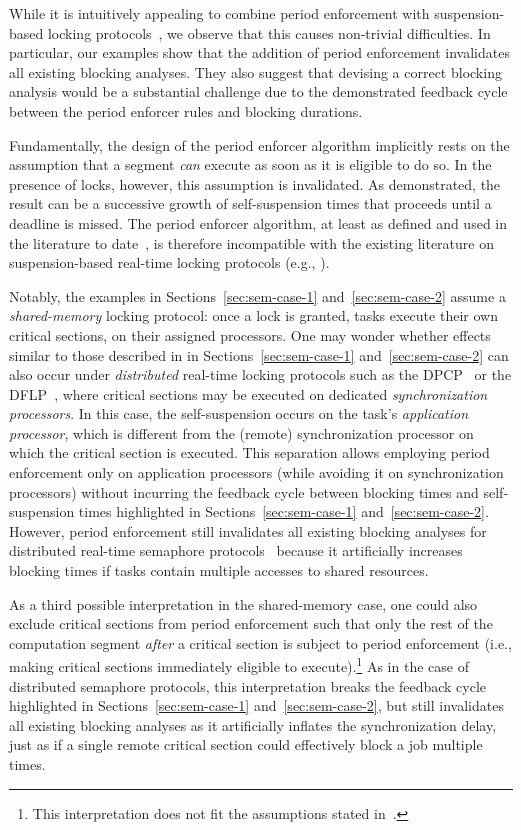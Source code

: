 While it is intuitively appealing to combine period enforcement with suspension-based locking protocols~\cite{Raj:91,Lak:11,LNR:09}, we observe that this causes non-trivial difficulties. In particular, our examples show that the addition of period enforcement invalidates all existing blocking analyses. They also suggest that devising a correct blocking analysis would be a substantial challenge due to the demonstrated feedback cycle between the period enforcer rules and blocking durations. 


Fundamentally, the design of the period enforcer algorithm implicitly rests on the assumption that a segment \emph{can} execute as soon as it is eligible to do so. In the presence of locks, however, this assumption is invalidated. As demonstrated, the result can be a successive growth of self-suspension times that proceeds until a deadline is missed.  The period enforcer algorithm, at least as defined and used in the literature to date~\cite{Raj:suspension1991,Raj:91}, is therefore incompatible with the existing literature on suspension-based real-time locking protocols (e.g., \cite{Raj:91,Lak:11,LNR:09,BLBA:07,Br:13}). 

Notably, the examples in Sections~\ref{sec:sem-case-1} and~\ref{sec:sem-case-2} assume a \emph{shared-memory} locking protocol: once a lock is granted, tasks execute their own critical sections, on their assigned processors. One may wonder whether  effects similar to those described in in Sections~\ref{sec:sem-case-1} and~\ref{sec:sem-case-2} can also occur under \emph{distributed} real-time locking protocols such as the DPCP~\cite{RSL:88} or the DFLP~\cite{Br:13,Br:14}, where critical sections may be executed on dedicated \emph{synchronization processors}. In this case, the self-suspension occurs on the task's \emph{application processor}, which is different from the (remote) synchronization processor on which the critical section is executed. This separation allows employing period enforcement  only on application processors (while avoiding it on synchronization processors) without incurring the feedback cycle between blocking times and self-suspension times highlighted in Sections~\ref{sec:sem-case-1} and~\ref{sec:sem-case-2}. However, period enforcement still invalidates all existing blocking analyses for distributed real-time semaphore protocols~\cite{RSL:88,Raj:91,Br:13} because it artificially increases blocking times if tasks contain multiple accesses to shared resources.

As a third possible interpretation in the shared-memory case, one could also exclude critical sections from period enforcement such that only the rest of the computation segment \emph{after} a critical section is subject to period enforcement (i.e., making critical sections immediately eligible to execute).\footnote{This interpretation does not fit the assumptions stated in~\cite{Raj:suspension1991,Raj:91}.} As in the case of distributed semaphore protocols, this interpretation breaks the feedback cycle highlighted in Sections~\ref{sec:sem-case-1} and~\ref{sec:sem-case-2}, but still invalidates all existing blocking analyses as it artificially inflates the synchronization delay, just as if a single remote critical section could effectively block a job multiple times.

